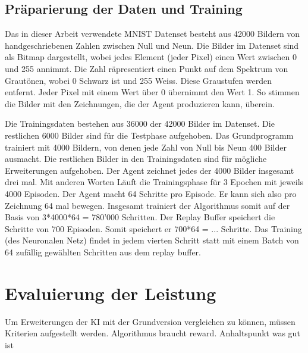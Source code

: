 
\subsection*{Präparierung der Daten und Training}
Das in dieser Arbeit verwendete MNIST Datenset besteht aus 42000 Bildern von
handgeschriebenen Zahlen zwischen Null und Neun. Die Bilder im Datenset sind als
Bitmap dargestellt, wobei jedes Element (jeder Pixel) einen Wert zwischen 0 und
255 annimmt. Die Zahl räpresentiert einen Punkt auf dem Spektrum von Grautönen,
wobei 0 Schwarz ist und 255 Weiss. Diese Graustufen werden entfernt. Jeder Pixel
mit einem Wert über 0 übernimmt den Wert 1. So stimmen die Bilder mit den
Zeichnungen, die der Agent produzieren kann, überein.

Die Trainingsdaten bestehen aus 36000 der 42000 Bilder im Datenset. Die
restlichen 6000 Bilder sind für die Testphase aufgehoben. Das Grundprogramm
trainiert mit 4000 Bildern, von denen jede Zahl von Null bis Neun 400 Bilder
ausmacht. Die restlichen Bilder in den Trainingsdaten sind für mögliche
Erweiterungen aufgehoben. Der Agent zeichnet jedes der 4000 Bilder insgesamt
drei mal. Mit anderen Worten Läuft die Trainingsphase für 3 Epochen mit jeweils
4000 Episoden. Der Agent macht 64 Schritte pro Episode. Er kann sich also pro
Zeichnung 64 mal bewegen. Insgesamt trainiert der Algorithmus somit auf der
Basis von 3*4000*64 = 780'000 Schritten. Der Replay Buffer speichert die
Schritte von 700 Episoden. Somit speichert er 700*64 = ... Schritte. Das
Training (des Neuronalen Netz) findet in jedem vierten Schritt statt mit einem
Batch von 64 zufällig gewählten Schritten aus dem replay buffer. 










\section{Evaluierung der Leistung}
    Um Erweiterungen der KI mit der Grundversion vergleichen zu können, müssen Kriterien aufgestellt werden. 
    Algorithmus braucht reward. Anhaltspunkt was gut ist
    
